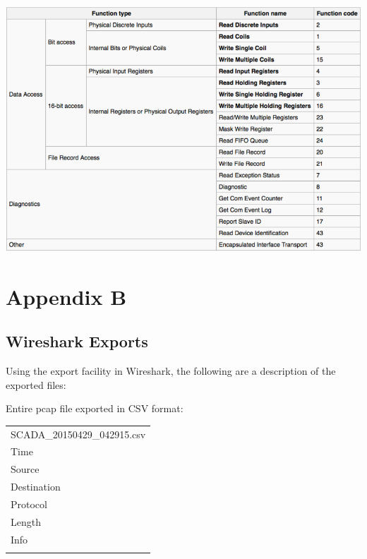 \documentclass[11pt,]{article}
\begin{document}
\begin{center}\includegraphics{thesis_files/figure-latex/unnamed-chunk-42-1} \end{center}

\clearpage

\section*{Appendix B}\label{appendix-b}

\subsection*{Wireshark Exports}\label{wireshark-exports}

Using the export facility in Wireshark, the following are a description
of the exported files:

Entire pcap file exported in CSV format:

\begin{longtable}[c]{@{}l@{}}
\toprule\addlinespace
SCADA\_20150429\_042915.csv
\\\addlinespace
\midrule\endhead
Time
\\\addlinespace
Source
\\\addlinespace
Destination
\\\addlinespace
Protocol
\\\addlinespace
Length
\\\addlinespace
Info
\\\addlinespace
\bottomrule
\end{longtable}
\end{document}
